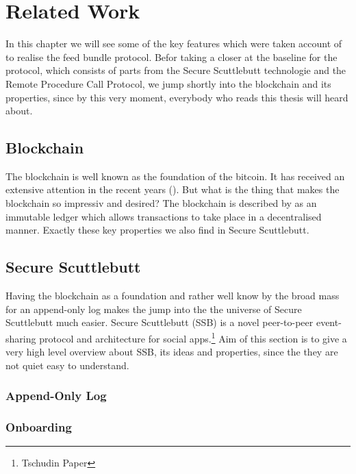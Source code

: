 \chapter{Related Work}
In this chapter we will see some of the key features which were taken account of to realise the
feed bundle protocol. Befor taking a closer at the baseline for the protocol, which consists of
parts from the Secure Scuttlebutt technologie and the Remote Procedure Call Protocol, we
jump shortly into the blockchain and its properties, since by this very moment, everybody
who reads this thesis will heard about.
\section{Blockchain}
The blockchain is well known as the foundation of the bitcoin. It has received an extensive
attention in the recent years (\citet{8029379}). But what is the thing that makes the blockchain so impressiv
and desired? The blockchain is described by \citet{8029379} as an immutable ledger which allows transactions to take place in a decentralised manner. Exactly these key properties we also find
in Secure Scuttlebutt.
\section{Secure Scuttlebutt}
Having the blockchain as a foundation and rather well know by the broad mass for an
append-only log makes the jump into the the universe of Secure Scuttlebutt much easier.
Secure Scuttlebutt (SSB) is a novel peer-to-peer event-sharing protocol and architecture for
social apps.\footnote{Tschudin Paper} Aim of this section is to give a very high level overview about SSB, its ideas
and properties, since the they are not quiet easy to understand.

\subsection{Append-Only Log}

\subsection{Onboarding}
